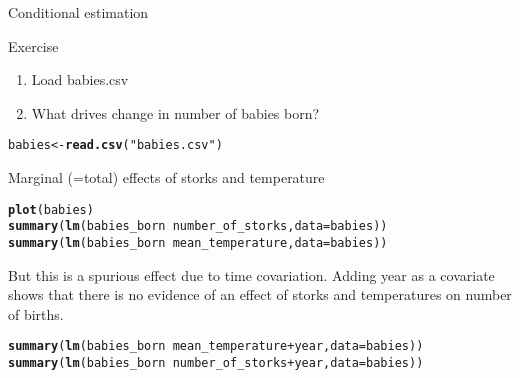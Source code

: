 \documentclass[10pt]{beamer}\usepackage[]{graphicx}\usepackage[]{color}
\makeatletter
\newcommand{\hlstr}[1]{\textcolor[rgb]{0.192,0.494,0.8}{#1}}%
\newcommand{\hlopt}[1]{\textcolor[rgb]{0,0,0}{#1}}%
\newcommand{\hlstd}[1]{\textcolor[rgb]{0.345,0.345,0.345}{#1}}%
\newcommand{\hlkwb}[1]{\textcolor[rgb]{0.69,0.353,0.396}{#1}}%
\newcommand{\hlkwc}[1]{\textcolor[rgb]{0.333,0.667,0.333}{#1}}%
\newcommand{\hlkwd}[1]{\textcolor[rgb]{0.737,0.353,0.396}{\textbf{#1}}}%
\newenvironment{kframe}{%
 \def\at@end@of@kframe{}%
 \ifinner\ifhmode%
  \def\at@end@of@kframe{\end{minipage}}%
  \begin{minipage}{\columnwidth}%
 \fi\fi%
 \def\FrameCommand##1{\hskip\@totalleftmargin \hskip-\fboxsep
 \colorbox{shadecolor}{##1}\hskip-\fboxsep
     \hskip-\linewidth \hskip-\@totalleftmargin \hskip\columnwidth}%
 \MakeFramed {\advance\hsize-\width
   \@totalleftmargin\z@ \linewidth\hsize
   \@setminipage}}%
 {\par\unskip\endMakeFramed%
 \at@end@of@kframe}
\newenvironment{knitrout}{}{} %
\makeatother
\begin{document}
\begin{frame}[fragile]{Conditional estimation}

  
  \begin{exampleblock}{Exercise}
    \begin{enumerate}
      \item Load babies.csv
      \item What drives change in number of babies born?
    \end{enumerate}
  \end{exampleblock}
  
\begin{knitrout}\small
{}\color{fgcolor}\begin{kframe}
\begin{alltt}
\hlstd{babies} \hlkwb{<-} \hlkwd{read.csv}\hlstd{(}\hlstr{"babies.csv"}\hlstd{)}
\end{alltt}
\end{kframe}
\end{knitrout}
  
  Marginal (=total) effects of storks and temperature
\begin{knitrout}\small
{}\color{fgcolor}\begin{kframe}
\begin{alltt}
  \hlkwd{plot}\hlstd{(babies)}
\hlkwd{summary}\hlstd{(}\hlkwd{lm}\hlstd{(babies_born} \hlopt{~} \hlstd{number_of_storks,} \hlkwc{data}\hlstd{=babies))}
\hlkwd{summary}\hlstd{(}\hlkwd{lm}\hlstd{(babies_born} \hlopt{~} \hlstd{mean_temperature,} \hlkwc{data}\hlstd{=babies))}
\end{alltt}
\end{kframe}
\end{knitrout}
  
  But this is a spurious effect due to time covariation. Adding year as a covariate shows that there is no evidence of an effect of storks and temperatures on number of births. 
\begin{knitrout}\small
{}\color{fgcolor}\begin{kframe}
\begin{alltt}
  \hlkwd{summary}\hlstd{(}\hlkwd{lm}\hlstd{(babies_born} \hlopt{~} \hlstd{mean_temperature} \hlopt{+} \hlstd{year,} \hlkwc{data}\hlstd{=babies))}
  \hlkwd{summary}\hlstd{(}\hlkwd{lm}\hlstd{(babies_born} \hlopt{~} \hlstd{number_of_storks} \hlopt{+} \hlstd{year,} \hlkwc{data}\hlstd{=babies))}
\end{alltt}
\end{kframe}
\end{knitrout}
  
\end{frame}
\end{document}

